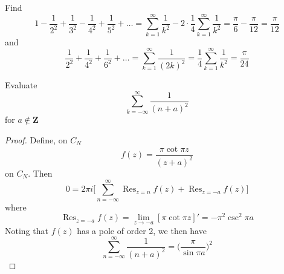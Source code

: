 \vspace{2ex}
\begin{ex}
Find
\[1-\dfrac{1}{2^2}+\dfrac{1}{3^2}-\dfrac{1}{4^2}+\dfrac{1}{5^2}+\ldots =\sum ^{\infty }_{k=1}\dfrac{1}{k^2}-2\cdot \dfrac{1}{4}\sum ^{\infty }_{k=1}\dfrac{1}{k^2}=\dfrac{\pi }{6}-\dfrac{\pi }{12}=\dfrac{\pi }{12}\]
and 
\[\dfrac{1}{2^2}+\dfrac{1}{4^2}+\dfrac{1}{6^2}+\ldots =\sum ^{\infty }_{k=1}\dfrac{1}{(2k)^2}=\dfrac{1}{4}\sum ^{\infty }_{k=1}\dfrac{1}{k^2}=\dfrac{\pi }{24}\]
\end{ex}
\vspace{2ex}
\begin{ex}
Evaluate
\[\sum ^{\infty }_{k=-\infty }\dfrac{1}{(n+a)^2}\]
for $a\notin {\bm Z}$
\end{ex}
\vspace{2ex}
\begin{proof}
Define, on $C_{N}$
\[f(z)=\dfrac{\pi \cot\pi z}{(z+a)^2}\]
on $C_{N}$. Then
\[0=2\pi i\Big[\sum ^{\infty }_{n=-\infty }\mathop{\mathrm{Res}}_{z=n}f(z)+\mathop{\mathrm{Res}}_{z=-a}f(z)\Big]\]
where
\[\mathop{\mathrm{Res}}_{z=-a}f(z)=\lim _{z\rightarrow -a}[\pi \cot \pi z]'=-\pi ^2\csc^2\pi a\]
Noting that $f(z)$ has a pole of order 2, we then have
\[\sum ^{\infty }_{n=-\infty }\dfrac{1}{(n+a)^2}=\Big(\dfrac{\pi }{\sin \pi a}\Big)^2\]
\end{proof}
\vspace{2ex}



